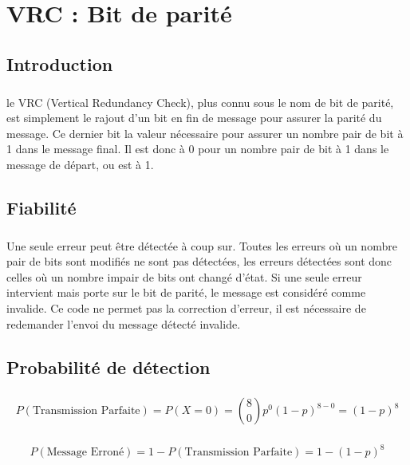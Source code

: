 
\chapter{VRC : Bit de parité}

    \section{Introduction}

        \paragraph{}
le VRC (Vertical Redundancy Check), plus connu sous le nom de bit de parité,
est simplement le rajout d'un bit en fin de message pour assurer la parité du message.
Ce dernier bit la valeur nécessaire pour assurer un nombre pair de bit à 1 dans le message final.
Il est donc à 0 pour un nombre pair de bit à 1 dans le message de départ, ou est à 1.


    \section{Fiabilité}

        \paragraph{}
Une seule erreur peut être détectée à coup sur.
Toutes les erreurs où un nombre pair de bits sont modifiés ne sont pas détectées,
les erreurs détectées sont donc celles où un nombre impair de bits ont changé d'état.
Si une seule erreur intervient mais porte sur le bit de parité, le message est considéré comme invalide.
Ce code ne permet pas la correction d'erreur, il est nécessaire de redemander l'envoi du message détecté invalide.


    \section{Probabilité de détection}

        \paragraph{}
\[  P(\text{Transmission Parfaite}) = P(X=0) = {8\choose 0}p^0(1-p)^{8-0} = (1-p)^8 \]
        \paragraph{}
\[  P(\text{Message Erroné}) = 1 - P(\text{Transmission Parfaite}) = 1 - (1-p)^8 \]
